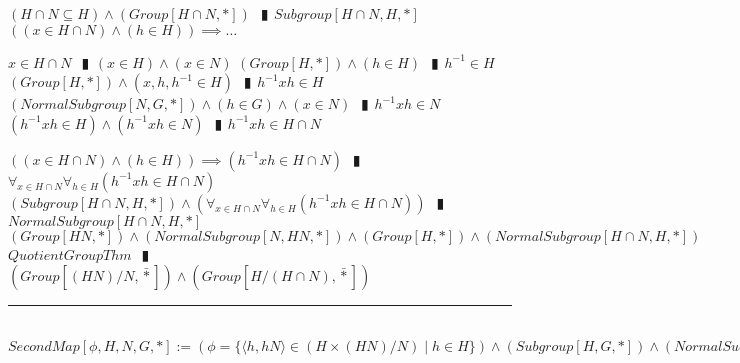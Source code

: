 \documentclass{book}
\newcommand{\abr}{:=}
\newcommand{\pipe}{$\phantom{(}\vrectangleblack\phantom{)}$}
\newcommand{\bbin}[1]{\mathbin{{\bar{#1}}}}
\newcommand{\st}{\mathbin{|}}
\begin{document}
\begin{enumerate}
  \lit $(H \cap N \subseteq H) \land (Group[H \cap N, *])$ \pipe $Subgroup[H \cap N, H, *]$
  \lit $((x \in H \cap N) \land (h \in H)) \implies \ldots$
  \begin{enumerate}
    \lit $x \in H \cap N$ \pipe $(x \in H) \land (x \in N)$
    \lit $(Group[H, *]) \land (h \in H)$ \pipe $h^{-1} \in H$
    \lit $(Group[H, *]) \land (x, h, h^{-1} \in H)$ \pipe $h^{-1} x h \in H$
    \lit $(NormalSubgroup[N, G, *]) \land (h \in G) \land (x \in N)$ \pipe $h^{-1} x h \in N$
    \lit $(h^{-1} x h \in H) \land (h^{-1} x h \in N)$ \pipe $h^{-1} x h \in H \cap N$
  \end{enumerate}
  \lit $((x \in H \cap N) \land (h \in H)) \implies (h^{-1} x h \in H \cap N)$ \pipe $\forall_{x \in H \cap N} \forall_{h \in H}(h^{-1} x h \in H \cap N)$
  \lit $(Subgroup[H \cap N, H, *]) \land (\forall_{x \in H \cap N} \forall_{h \in H}(h^{-1} x h \in H \cap N))$ \pipe $NormalSubgroup[H \cap N, H, *]$
  \lit $(Group[H N, *]) \land (NormalSubgroup[N, H N, *]) \land (Group[H, *]) \land (NormalSubgroup[H \cap N, H, *])$
  \lit $QuotientGroupThm$ \pipe $(Group[(H N) / N, \bbin{*}]) \land (Group[H / (H \cap N), \bbin{*}])$
\end{enumerate} \vspace{.75mm} \hrule \vspace{.75mm} \ \\

$SecondMap[\phi, H, N, G, *] \abr (\phi = \{\langle h, h N \rangle \in (H \times (H N) / N) \st h \in H\}) \land (Subgroup[H, G, *]) \land (NormalSubgroup[N, G, *])$ \\
\end{document}
